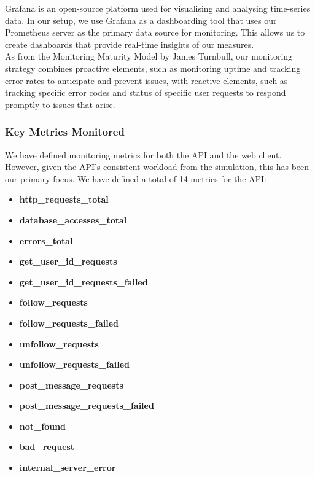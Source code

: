 Grafana is an open-source platform used for visualising and analysing time-series data. In our setup, we use Grafana as a dashboarding tool that uses our Prometheus server as the primary data source for monitoring. This allows us to create dashboards that provide real-time insights of our measures.\\

As from the Monitoring Maturity Model by James Turnbull\cite{MonitoringMaturityModel}, our monitoring strategy combines proactive elements, such as monitoring uptime and tracking error rates to anticipate and prevent issues, with reactive elements, such as tracking specific error codes and status of specific user requests to respond promptly to issues that arise.

\subsubsection*{Key Metrics Monitored}
We have defined monitoring metrics for both the API and the web client. However, given the API's consistent workload from the simulation, this has been our primary focus. We have defined a total of 14 metrics for the API:
\begin{multicols}{2}
\begin{itemize}
    \item \textbf{http\_requests\_total}
    \item \textbf{database\_accesses\_total}
    \item \textbf{errors\_total}
    \item \textbf{get\_user\_id\_requests}
    \item \textbf{get\_user\_id\_requests\_failed}
    \item \textbf{follow\_requests}
    \item \textbf{follow\_requests\_failed}
    \item \textbf{unfollow\_requests}
    \item \textbf{unfollow\_requests\_failed}
    \item \textbf{post\_message\_requests}
    \item \textbf{post\_message\_requests\_failed}
    \item \textbf{not\_found}
    \item \textbf{bad\_request}
    \item \textbf{internal\_server\_error}
\end{itemize}
\end{multicols}

